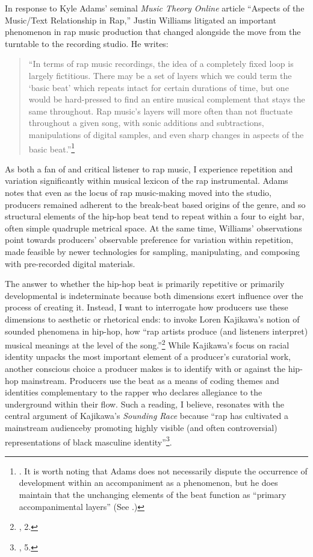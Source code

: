 In response to Kyle Adams' seminal \textit{Music Theory Online} article ``Aspects of the Music/Text Relationship in Rap,'' Justin Williams litigated an important phenomenon in rap music production that changed alongside the move from the turntable to the recording studio. He writes:

\begin{quote}
    \small ``In terms of rap music recordings, the idea of a completely fixed loop is largely fictitious. There may be a set of layers which we could term the `basic beat' which repeats intact for certain durations of time, but one would be hard-pressed to find an entire musical complement that stays the same throughout. Rap music’s layers will more often than not fluctuate throughout a given song, with sonic additions and subtractions, manipulations of digital samples, and even sharp changes in aspects of the basic beat.''\footnote{\cite{justinawilliamsBeatsFlowsResponse2009}. It is worth noting that Adams does not necessarily dispute the occurrence of development within an accompaniment as a phenomenon, but he does maintain that the unchanging elements of the beat function as ``primary accompanimental layers'' (See \cite{kyleadamsPeopleInstinctiveAssumptions2009}.)}
\end{quote}

\noindent \normalsize As both a fan of and critical listener to rap music, I experience repetition and variation significantly within musical lexicon of the rap instrumental. Adams notes that even as the locus of rap music-making moved into the studio, producers remained adherent to the break-beat based origins of the genre, and so structural elements of the hip-hop beat tend to repeat within a four to eight bar, often simple quadruple metrical space. At the same time, Williams' observations point towards producers' observable preference for variation within repetition, made feasible by newer technologies for sampling, manipulating, and composing with pre-recorded digital materials.

The answer to whether the hip-hop beat is primarily repetitive or primarily developmental is indeterminate because both dimensions exert influence over the process of creating it. Instead, I want to interrogate how producers use these dimensions to aesthetic or rhetorical ends: to invoke Loren Kajikawa's notion of sounded phenomena in hip-hop, how ``rap artists produce (and listeners interpret) musical meanings at the level of the song.''\footnote{\cite{lorenkajikawaSoundingRaceRap2015}, 2.} While Kajikawa's focus on racial identity unpacks the most important element of a producer's  curatorial work, another conscious choice a producer makes is to identify with or against the hip-hop mainstream. Producers use the beat as a means of coding themes and identities complementary to the rapper who declares allegiance to the underground within their flow. Such a reading, I believe, resonates with the central argument of Kajikawa's \textit{Sounding Race} because ``rap has cultivated a mainstream audience\textellipsis by promoting highly visible (and often controversial) representations of black masculine identity''\footnote{\cite{lorenkajikawaSoundingRaceRap2015}, 5.}.


